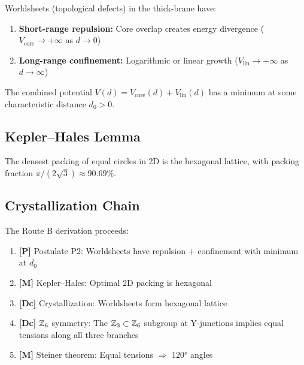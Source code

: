 \begin{derivationbox}[title=Postulate P2: Worldsheet Interactions]
    Worldsheets (topological defects) in the thick-brane have:
    \begin{enumerate}
        \item \textbf{Short-range repulsion:} Core overlap creates energy divergence
              ($V_{\mathrm{core}} \to +\infty$ as $d \to 0$)
        \item \textbf{Long-range confinement:} Logarithmic or linear growth
              ($V_{\mathrm{lin}} \to +\infty$ as $d \to \infty$)
    \end{enumerate}
    The combined potential $V(d) = V_{\mathrm{core}}(d) + V_{\mathrm{lin}}(d)$ has
    a minimum at some characteristic distance $d_0 > 0$. \tagP
\end{derivationbox}

\subsection{Kepler--Hales Lemma}

\begin{derivationbox}[title=Lemma B1: Kepler--Hales Optimal Packing]
    The densest packing of equal circles in 2D is the hexagonal lattice, with
    packing fraction $\pi/(2\sqrt{3}) \approx 90.69\%$. \tagM
\end{derivationbox}

\subsection{Crystallization Chain}

The Route B derivation proceeds:

\begin{enumerate}
    \item \textbf{[P]} Postulate P2: Worldsheets have repulsion + confinement with
          minimum at $d_0$
    \item \textbf{[M]} Kepler--Hales: Optimal 2D packing is hexagonal
    \item \textbf{[Dc]} Crystallization: Worldsheets form hexagonal lattice
    \item \textbf{[Dc]} $\mathbb{Z}_6$ symmetry: The $\mathbb{Z}_3 \subset \mathbb{Z}_6$ subgroup at
          Y-junctions implies equal tensions along all three branches
    \item \textbf{[M]} Steiner theorem: Equal tensions $\Rightarrow$ $120°$ angles
\end{enumerate}

